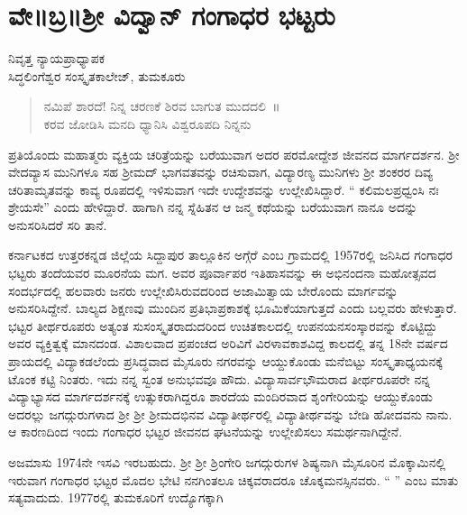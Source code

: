 {\fontsize{14}{16}\selectfont
\chapter{ವೇ॥ಬ್ರ॥ಶ್ರೀ ವಿದ್ವಾನ್ ಗಂಗಾಧರ ಭಟ್ಟರು}

\begin{center}
\smallskip
ನಿವೃತ್ತ  \enginline{-}  ನ್ಯಾಯಪ್ರಾಧ್ಯಾಪಕ\\
ಸಿದ್ಧಲಿಂಗೆಶ್ವರ ಸಂಸ್ಕೃತಕಾಲೇಜ್, ತುಮಕೂರು
\addrule
\end{center}

\begin{verse}
ನಮಿಪೆ ಶಾರದೆ! ನಿನ್ನ ಚರಣಕೆ ಶಿರವ ಬಾಗುತ ಮುದದಲಿ~॥\\
ಕರವ ಜೋಡಿಸಿ ಮನದಿ ಧ್ಯಾನಿಸಿ ವಿಶ್ವರೂಪದಿ ನಿನ್ನನು
\end{verse}

ಪ್ರತಿಯೊಂದು ಮಹಾತ್ಮರು ವ್ಯಕ್ತಿಯ ಚರಿತ್ರೆಯನ್ನು ಬರೆಯುವಾಗ ಅದರ ಪರಮೋ\-ದ್ದೇಶ ಜೀವನದ ಮಾರ್ಗದರ್ಶನ. ಶ್ರೀ ವೇದವ್ಯಾಸ ಮುನಿಗಳೂ ಸಹ ಶ್ರೀಮದ್ ಭಾಗವತವನ್ನು ರಚಿಸುವಾಗ, ವಿದ್ಯಾರಣ್ಯ ಮುನಿಗಳು ಶ್ರೀ ಶಂಕರರ ದಿವ್ಯ ಚರಿತಾಮೃತವನ್ನು ಕಾವ್ಯ ರೂಪದಲ್ಲಿ ಇಳಿಸುವಾಗ ಇದೇ ಉದ್ದೇಶವನ್ನು ಉಲ್ಲೇಖಿಸಿದ್ದಾರೆ. “ ಕಲಿಮಲಪ್ರಧ್ವಂಸಿ ನಃ ಶ್ರೇಯಸೇ” ಎಂದು ಹೇಳಿದ್ದಾರೆ. ಹಾಗಾಗಿ ನನ್ನ ಸ್ನೆಹಿತನ ಆ ಜನ್ಮ ಕಥೆಯನ್ನು ಬರೆಯುವಾಗ ನಾನೂ ಅದನ್ನು ಅನುಸರಿಸಿದರೆ ಸರಿ ತಾನೆ.

ಕರ್ನಾಟಕದ ಉತ್ತರಕನ್ನಡ ಜಿಲ್ಲೆಯ ಸಿದ್ದಾಪುರ ತಾಲ್ಲೂಕಿನ ಅಗ್ಗೆರೆ ಎಂಬ ಗ್ರಾಮದಲ್ಲಿ 1957ರಲ್ಲಿ ಜನಿಸಿದ ಗಂಗಾಧರ ಭಟ್ಟರು ತಂದೆಯವರ ಮೂರನೆಯ ಮಗ. ಅವರ ಪೂರ್ವಾಪರ ಇತಿಹಾಸವನ್ನು ಈ ಅಭಿನಂದನಾ ಮಹೋತ್ಸವದ ಸಂದರ್ಭದಲ್ಲಿ  ಹಲವಾರು ಜನರು ಉಲ್ಲೇಖಿಸಿರುವದರಿಂದ ಅಜಾಮಿತ್ವಾಯ ಬೇರೊಂದು ಮಾರ್ಗವನ್ನು ಅನುಸರಿಸಿದ್ದೇನೆ. ಬಾಲ್ಯದ ಶಿಕ್ಷಣವು ಮುಂದಿನ ಪ್ರತಿಭಾಪ್ರಕಾಶಕ್ಕೆ ಭೂಮಿಕೆಯಾಗುತ್ತದೆ ಎಂದು ಬಲ್ಲವರು ಹೇಳುತ್ತಾರೆ. ಭಟ್ಟರ ತೀರ್ಥರೂಪರು ಅತ್ಯಂತ ಸುಸಂಸ್ಕೃತ\-ರಾದುದರಿಂದ ಉಚಿತಕಾಲದಲ್ಲಿ ಉಪನಯನಸಂಸ್ಕಾರವನ್ನು ಕೊಟ್ಟಿದ್ದು ಅವರ ವ್ಯಕ್ತಿತ್ವಕ್ಕೆ ಮಾನದಂಡ. ವಿಶಾಲವಾದ ಪ್ರಪಂಚದ ಅರಿವಿಗೆ ವಿರಳಾವಕಾಶವಿದ್ದ ಕಾಲದಲ್ಲಿ ತನ್ನ 18ನೇ ವರ್ಷದ ಪ್ರಾಯದಲ್ಲಿ ವಿದ್ಯಾಕಡಲೆಂದು ಪ್ರಸಿದ್ಧವಾದ ಮೈಸೂರು ನಗರವನ್ನು ಆಯ್ದುಕೊಂಡು ಮನೆಬಿಟ್ಟು ಸಂಸ್ಕೃತಾಧ್ಯಯನಕ್ಕೆ ಟೊಂಕ ಕಟ್ಟಿ ನಿಂತರು. ಇದು ನನ್ನ ಸ್ವಂತ ಅನುಭವವೂ ಹೌದು. ವಿದ್ಯಾಸಾರ್ವಭೌಮರಾದ ತೀರ್ಥರೂಪರೇ ನನ್ನ ವಿದ್ಯಾಭ್ಯಾಸದ ಮಾರ್ಗದರ್ಶನಕ್ಕೆ ಉತ್ಸುಕರಾಗಿದ್ದರೂ ಶಾರದೆಯ ಮಂದಿರವಾದ ಶೃಂಗೇರಿಯನ್ನು ಆಯ್ದುಕೊಂಡು ಅದರಲ್ಲು ಜಗದ್ಗುರುಗಳಾದ ಶ್ರೀ ಶ್ರೀ ಶ್ರೀಮದಭಿನವ ವಿದ್ಯಾ\-ತೀರ್ಥರಲ್ಲಿ ವಿದ್ಯಾತೀರ್ಥವನ್ನು ಬೇಡಿ ಹೋದವನು ನಾನು. ಆ ಕಾರಣದಿಂದ ಇಂದು ಗಂಗಾಧರ ಭಟ್ಟರ ಜೀವನದ ಘಟನೆಯನ್ನು ಉಲ್ಲೇಖಿಸಲು ಸಮರ್ಥನಾಗಿದ್ದೇನೆ.

ಅಜಮಾಸು 1974ನೇ ಇಸವಿ ಇರಬಹುದು. ಶ್ರೀ ಶ್ರೀ ಶ್ರಿಂಗೇರಿ ಜಗದ್ಗುರುಗಳ ಶಿಷ್ಯನಾಗಿ ಮೈಸೂರಿನ ಮೊಕ್ಕಾಮಿನಲ್ಲಿ ಇರುವಾಗ ಗಂಗಾಧರ ಭಟ್ಟರ ಮೊದಲ ಭೇಟಿ ನನಗಿಂತಲೂ ಚಿಕ್ಕವರಾದರೂ ಚೊಕ್ಕಮನಸ್ಸಿನವರು. “  \enginline{-}    \enginline{-}  ” ಎಂಬ ಮಾತು ಸತ್ಯವಾದುದು. 1977ರಲ್ಲಿ ತುಮಕೂರಿಗೆ ಉದ್ಯೊಗಕ್ಕಾಗಿ

}
